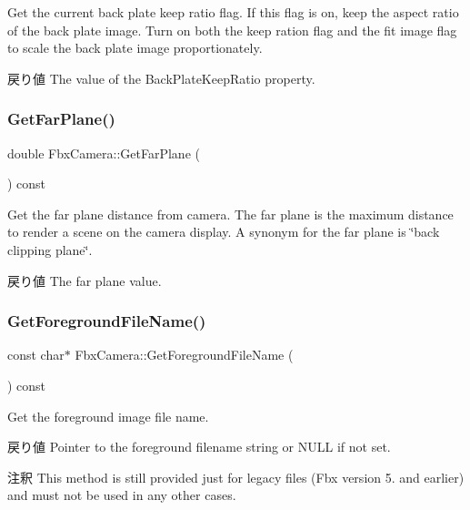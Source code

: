 Get the current back plate keep ratio flag. If this flag is on, keep the aspect ratio of the back plate image. Turn on both the keep ration flag and the fit image flag to scale the back plate image proportionately. \begin{DoxyReturn}{戻り値}
The value of the Back\+Plate\+Keep\+Ratio property. 
\end{DoxyReturn}
\mbox{\label{class_fbx_camera_a07b8a3633669335c8adde9049574d5cc}} 
\subsubsection{\texorpdfstring{Get\+Far\+Plane()}{GetFarPlane()}}
{\footnotesize\ttfamily double Fbx\+Camera\+::\+Get\+Far\+Plane (\begin{DoxyParamCaption}{ }\end{DoxyParamCaption}) const}

Get the far plane distance from camera. The far plane is the maximum distance to render a scene on the camera display. A synonym for the far plane is \char`\"{}back clipping plane\char`\"{}. \begin{DoxyReturn}{戻り値}
The far plane value. 
\end{DoxyReturn}
\mbox{\label{class_fbx_camera_abe9513ba9360600c1691e9e96310ee85}} 
\subsubsection{\texorpdfstring{Get\+Foreground\+File\+Name()}{GetForegroundFileName()}}
{\footnotesize\ttfamily const char$\ast$ Fbx\+Camera\+::\+Get\+Foreground\+File\+Name (\begin{DoxyParamCaption}{ }\end{DoxyParamCaption}) const}

Get the foreground image file name. \begin{DoxyReturn}{戻り値}
Pointer to the foreground filename string or {\ttfamily N\+U\+LL} if not set. 
\end{DoxyReturn}
\begin{DoxyRemark}{注釈}
This method is still provided just for legacy files (Fbx version 5. and earlier) and must not be used in any other cases. 
\end{DoxyRemark}
\mbox{\label{class_fbx_camera_a3ce6171880a10098f2b3bc21e0ee5427}} 
